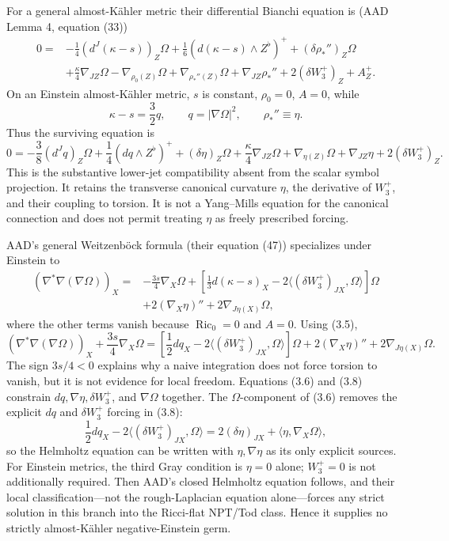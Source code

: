 \documentclass[
  10pt,
]{report}
\begin{document}
For a general almost-Kähler metric their differential Bianchi equation
is (AAD Lemma 4, equation (33)) \[
\begin{aligned}
0={}&-\tfrac14(d^J(\kappa-s))_Z\Omega
+\tfrac16(d(\kappa-s)\wedge Z^\flat)^+
+(\delta\rho_*'')_Z\Omega \\
&+\tfrac\kappa4\nabla_{JZ}\Omega
-\nabla_{\rho_0(Z)}\Omega
+\nabla_{\rho_*''(Z)}\Omega
+\nabla_{JZ}\rho_*''
+2(\delta W_3^+)_Z+A_Z^+.
\end{aligned}
\tag{3.4}
\] On an Einstein almost-Kähler metric, \(s\) is constant, \(\rho_0=0\),
\(A=0\), while \[
\kappa-s=\frac32q,
\qquad q=|\nabla\Omega|^2,
\qquad \rho_*''\equiv\eta .
\tag{3.5}
\] Thus the surviving equation is \[
\boxed{
0=-\frac38(d^Jq)_Z\Omega
+\frac14(dq\wedge Z^\flat)^+
+(\delta\eta)_Z\Omega
+\frac\kappa4\nabla_{JZ}\Omega
+\nabla_{\eta(Z)}\Omega
+\nabla_{JZ}\eta
+2(\delta W_3^+)_Z .}
\tag{3.6}
\] This is the substantive lower-jet compatibility absent from the
scalar symbol projection. It retains the transverse canonical curvature
\(\eta\), the derivative of \(W_3^+\), and their coupling to torsion. It
is not a Yang--Mills equation for the canonical connection and does not
permit treating \(\eta\) as freely prescribed forcing.

AAD's general Weitzenböck formula (their equation (47)) specializes
under Einstein to \[
\begin{aligned}
(\nabla^*\nabla(\nabla\Omega))_X={}&-\frac{3s}{4}\nabla_X\Omega
+\left[\frac13d(\kappa-s)_X
-2\langle(\delta W_3^+)_{JX},\Omega\rangle\right]\Omega \\
&+2(\nabla_X\eta)''+2\nabla_{J\eta(X)}\Omega,
\end{aligned}
\tag{3.7}
\] where the other terms vanish because \(\operatorname{Ric}_0=0\) and
\(A=0\). Using (3.5), \[
\boxed{
(\nabla^*\nabla(\nabla\Omega))_X
+\frac{3s}{4}\nabla_X\Omega
=\left[\frac12dq_X
-2\langle(\delta W_3^+)_{JX},\Omega\rangle\right]\Omega
+2(\nabla_X\eta)''+2\nabla_{J\eta(X)}\Omega .}
\tag{3.8}
\] The sign \(3s/4<0\) explains why a naive integration does not force
torsion to vanish, but it is not evidence for local freedom. Equations
(3.6) and (3.8) constrain \(dq,\nabla\eta,\delta W_3^+\), and
\(\nabla\Omega\) together. The \(\Omega\)-component of (3.6) removes the
explicit \(dq\) and \(\delta W_3^+\) forcing in (3.8): \[
\frac12dq_X-2\langle(\delta W_3^+)_{JX},\Omega\rangle
=2(\delta\eta)_{JX}+\langle\eta,\nabla_X\Omega\rangle,
\tag{3.9}
\] so the Helmholtz equation can be written with \(\eta,\nabla\eta\) as
its only explicit sources. For Einstein metrics, the third Gray
condition is \(\eta=0\) alone; \(W_3^+=0\) is not additionally required.
Then AAD's closed Helmholtz equation follows, and their local
classification---not the rough-Laplacian equation alone---forces any
strict solution in this branch into the Ricci-flat NPT/Tod class. Hence
it supplies no strictly almost-Kähler negative-Einstein germ.
\end{document}
